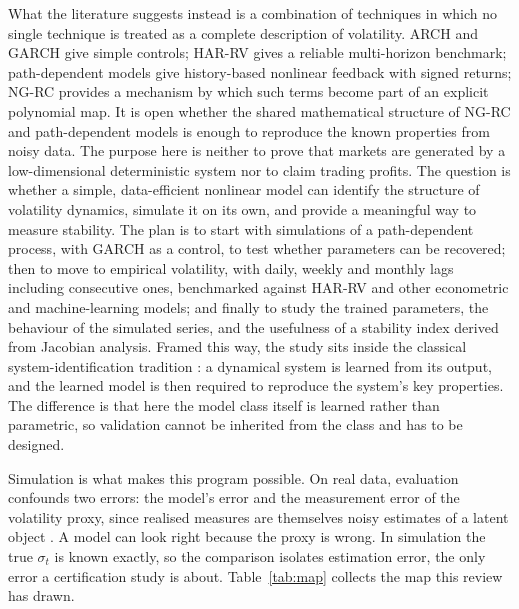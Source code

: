 \documentclass[12pt,a4paper]{article}
\begin{document}
What the literature suggests instead is a combination of techniques in
which no single technique is treated as a complete description of
volatility. ARCH and GARCH give simple controls; HAR-RV gives a reliable
multi-horizon benchmark; path-dependent models give history-based
nonlinear feedback with signed returns; NG-RC provides a mechanism by
which such terms become part of an explicit polynomial map. It is open
whether the shared mathematical structure of NG-RC and path-dependent
models is enough to reproduce the known properties from noisy data. The
purpose here is neither to prove that markets are generated by a
low-dimensional deterministic system nor to claim trading profits. The
question is whether a simple, data-efficient nonlinear model can identify
the structure of volatility dynamics, simulate it on its own, and provide
a meaningful way to measure stability. The plan is to start with
simulations of a path-dependent process, with GARCH as a control, to test
whether parameters can be recovered; then to move to empirical volatility,
with daily, weekly and monthly lags including consecutive ones, benchmarked
against HAR-RV and other econometric and machine-learning models; and
finally to study the trained parameters, the behaviour of the simulated
series, and the usefulness of a stability index derived from Jacobian
analysis. Framed this way, the study sits inside the classical
system-identification tradition \citep{ljung1999}: a dynamical system
is learned from its output, and the learned model is then required to
reproduce the system's key properties. The difference is that here the
model class itself is learned rather than parametric, so validation
cannot be inherited from the class and has to be designed.

Simulation is what makes this program possible. On real data, evaluation
confounds two errors: the model's error and the measurement error of the
volatility proxy, since realised measures are themselves noisy estimates
of a latent object \citep{andersen1998,andersen2001}. A model can look
right because the proxy is wrong. In simulation the true $\sigma_t$ is
known exactly, so the comparison isolates estimation error, the only
error a certification study is about. Table~\ref{tab:map} collects the
map this review has drawn.
\end{document}
